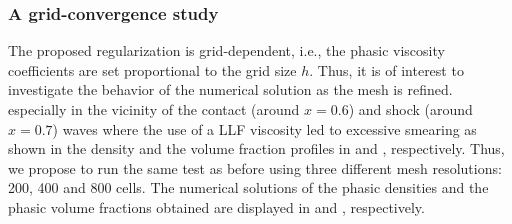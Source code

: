 \subsubsection{A grid-convergence study}\label{sec:grid-conv-study}
The proposed regularization is grid-dependent, i.e., the phasic viscosity coefficients are set proportional to the grid size $h$. Thus, it is of interest to investigate the behavior of the numerical solution as the mesh is refined. especially in the
vicinity of the contact (around $x=0.6$) and shock (around $x=0.7$) waves where the use of a LLF viscosity led to excessive smearing as shown in the density and the volume fraction profiles in  and 
, respectively. Thus, we propose to run the same test as before using three different mesh resolutions:
 200, 400 and 800 cells. The numerical solutions of the phasic densities and the phasic volume fractions obtained are displayed
in  and , respectively.
%
